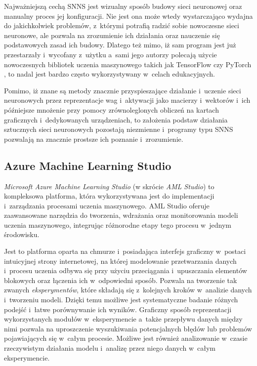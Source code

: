 Najważniejszą cechą SNNS jest wizualny sposób budowy sieci neuronowej oraz manualny proces jej konfiguracji.
Nie jest ona może wtedy wystarczająco wydajna do jakichkolwiek problemów, z~którymi potrafią radzić sobie nowoczesne sieci neuronowe, ale pozwala na zrozumienie ich działania oraz nauczenie się podstawowych zasad ich budowy.
Dlatego też mimo, iż sam program jest już przestarzały i~wycofany z~użytku a~sami jego autorzy polecają użycie nowoczesnych bibliotek uczenia maszynowego takich jak TensorFlow czy PyTorch \cite{snns}, to nadal jest bardzo często wykorzystywany w~celach edukacyjnych.

Pomimo, iż znane są metody znacznie przyspieszające działanie i~uczenie sieci neuronowych przez reprezentacje wag i~aktywacji jako macierzy i~wektorów i~ich późniejsze mnożenie przy pomocy zrównoleglonych obliczeń na kartach graficznych i~dedykowanych urządzeniach, to założenia podstaw działania sztucznych sieci neuronowych pozostają niezmienne i~programy typu SNNS pozwalają na znacznie prostsze ich poznanie i~zrozumienie.

\subsection{Azure Machine Learning Studio}

\emph{Microsoft Azure Machine Learning Studio} (w skrócie \emph{AML Studio}) to kompleksowa platforma, która wykorzystywana jest do implementacji i~zarządzania procesami uczenia maszynowego.
AML Studio oferuje zaawansowane narzędzia do tworzenia, wdrażania oraz monitorowania modeli uczenia maszynowego, integrując różnorodne etapy tego procesu w~jednym środowisku.

Jest to platforma oparta na chmurze i~posiadająca interfejs graficzny w~postaci intuicyjnej strony internetowej, na której modelowanie przetwarzania danych i~procesu uczenia odbywa się przy użyciu przeciągania i~upuszczania elementów blokowych oraz łączenia ich w~odpowiedni sposób.
Pozwala na tworzenie tak zwanych \emph{eksperymentów}, które składają się z~kolejnych kroków w~analizie danych i~tworzeniu modeli.
Dzięki temu możliwe jest systematyczne badanie różnych podejść i~łatwe porównywanie ich wyników.
Graficzny sposób reprezentacji wykorzystanych modułów w~eksperymencie a~także przepływu danych między nimi pozwala na uproszczenie wyszukiwania potencjalnych błędów lub problemów pojawiających się w~całym procesie.
Możliwe jest również analizowanie w~czasie rzeczywistym działania modelu i~analizę przez niego danych w~całym eksperymencie.

